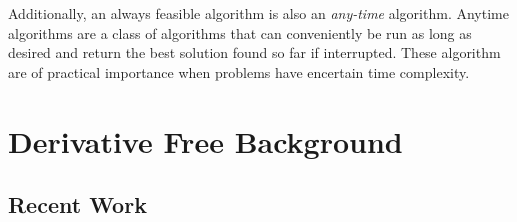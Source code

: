\documentclass{article}
\theoremstyle{case}
\begin{document}
Additionally, an always feasible algorithm is also an \emph{any-time} algorithm.
Anytime algorithms are a class of algorithms that can conveniently be run as long as desired and return the best solution found so far if interrupted.
These algorithm are of practical importance when problems have encertain time complexity.


\section{Derivative Free Background}
% 
% 
% 

\subsection{Recent Work}
\end{document}
